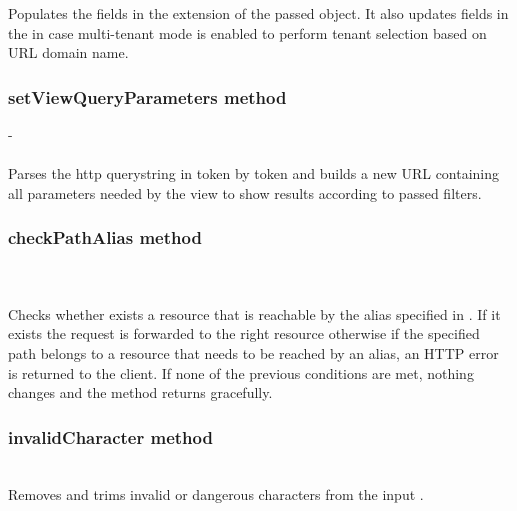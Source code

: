Populates the fields in the  extension of the passed  object. It also updates fields in the  in case multi-tenant mode is enabled to perform tenant selection based on URL domain name.

\newpage
\subsubsection{setViewQueryParameters method}
-\\\\ 

Parses the http querystring in  token by token and builds a new URL containing all parameters needed by the view to show results according to passed filters.

\subsubsection{checkPathAlias method}
\\\\

Checks whether exists a resource that is reachable by the alias specified in . If it exists the request is forwarded to the right resource otherwise if the specified path belongs to a resource that needs to be reached by an alias, an HTTP  error is returned to the client. If none of the previous conditions are met, nothing changes and the method returns gracefully.

\subsubsection{invalidCharacter method}
\\

Removes and trims invalid or dangerous characters from the input .



\newpage

